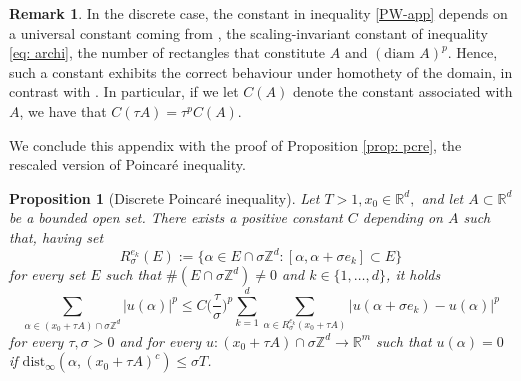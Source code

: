 \documentclass{article}
\theoremstyle{plain}
\newtheorem{proposition}[theorem]{Proposition}
\theoremstyle{definition}
\newtheorem{remark}[theorem]{Remark}
\def\rr{{\mathbb R}}
\def\ZZ{{\mathbb Z}}
\newcommand{\s}{\sigma}
\numberwithin{equation}{section}
\begin{document}
\begin{remark}
   In the discrete case, the constant in inequality \eqref{PW-app} depends on a universal constant coming from \cite[Lemma 3.6]{AliCic}, the scaling-invariant constant of inequality \eqref{eq: archi}, the number of rectangles that constitute $A$ and $(\text{diam }A)^p$. Hence, such a constant exhibits the correct behaviour under homothety of the domain, in contrast with \cite[Lemma 2 and Lemma 3]{BraSig}. In particular, if we let $C(A)$ denote the constant associated with $A$, we have that $C(\tau A)=\tau^p C(A)$.
\end{remark}

We conclude this appendix with the proof of Proposition \ref{prop: pcre}, the rescaled version of Poincaré inequality. 

\begin{proposition}
[Discrete Poincaré inequality]
\label{Appendix Discrete Poincare}
 Let $T>1, x_0\in \rr^d,$ and let $A\subset \mathbb{R}^d$ be a bounded open set. There exists a positive constant $C$ depending on $A$ such that, having set
\begin{equation*}
    R_\s^{e_k}(E):=\{\alpha\in E\cap \s\ZZ^d: [\alpha,\alpha+\s e_k]\subset E\}
\end{equation*}
for every set $E$ such that $\#(E\cap \s\ZZ^d)\neq0$ and $k\in\{1,\dots, d\}$, it holds
 \begin{equation*}
    \sum_{\alpha \in (x_0+\tau A) \cap \s\mathbb{Z}^d}|u(\alpha)|^p\leq C\Big(\frac{\tau}{\s}\Big)^p\sum_{k=1}^d\sum_{\alpha\in R_\s^{e_k}(x_0+\tau A)}|u(\alpha+\s e_k)-u(\alpha)|^p
\end{equation*}
for every $\tau,\s>0$ and for every $u:(x_0+\tau A)\cap \s\mathbb{Z}^d\to \mathbb{R}^m$ such that $u(\alpha)=0$ if  \mbox{$\text{dist}_\infty(\alpha ,(x_0+\tau A)^c)\leq \s T$.}
\end{proposition}
\end{document}
